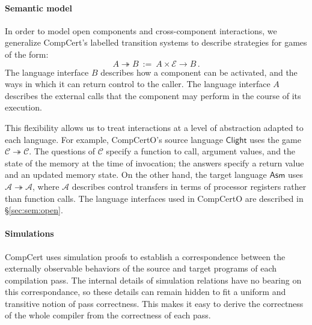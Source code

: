 \documentclass[acmsmall,screen,review,anonymous]{acmart}
\newcommand{\kw}[1]{\ensuremath{ \mathsf{#1} }}
\begin{document}
\paragraph{Semantic model} %

In order to model open components and cross-component interactions,
we generalize CompCert's labelled transition systems
to describe strategies for games of the form:
\[ A \twoheadrightarrow B \: := \:
   A \times \mathcal{E} \rightarrow B \,. \]
The language interface $B$ describes how a component can be activated,
and the ways in which it can return control to the caller.
The language interface $A$ describes the external calls that the component
may perform in the course of its execution.

This flexibility allows us to treat interactions
at a level of abstraction adapted to each language.
For example, CompCertO's source language \kw{Clight} uses the game
\mbox{$\mathcal{C} \twoheadrightarrow \mathcal{C}$}.
The questions of $\mathcal{C}$ specify a function to call,
argument values,
and the state of the memory at the time of invocation;
the answers specify a return value and an updated memory state.
On the other hand, the target language \kw{Asm} uses
$\mathcal{A} \twoheadrightarrow \mathcal{A}$,
where $\mathcal{A}$ describes control transfers
in terms of processor registers
rather than function calls.
The language interfaces used in CompCertO
are described in \S\ref{sec:sem:open}.



\paragraph{Simulations} %

CompCert uses simulation proofs
to establish a correspondence between
the externally observable behaviors of
the source and target programs of each compilation pass.
The internal details of simulation relations
have no bearing on this correspondance,
so these details can remain hidden
to fit a uniform and transitive notion of pass correctness.
This makes it easy to derive the correctness
of the whole compiler
from the correctness of each pass.
\end{document}
